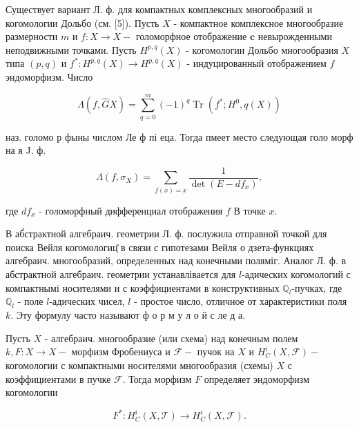 \documentclass[10pt]{article}
\begin{document}
Существует вариант Л. ф. для компактных комплексных многообразий и когомологии Дольбо (см. [5]). Пусть $X$ - компактное комплексное многообразие размерности $m$ и $f: X \rightarrow X-$ голоморфное отображение $\mathbf{c}$ невырожденными неподвижными точками. Пусть $H^{p, q}(X)$ - когомологии Дольбо многообразия $X$ типа $(p, q)$ и $f^{*}: H^{p, q}(X) \rightarrow H^{p, q}(X)$ - индуцированный отображением $f$ эндоморфизм. Число



\[

\Lambda(f, \widehat{G} X)=\sum_{q=0}^{m}(-1)^{q} \operatorname{Tr}\left(f^{*} ; H^{0}, q(X)\right)

\]



наз. голомо р фыны числом Ле ф пі еца. Тогда пмеет место следующая голо морф на я J. ф.



\[

\Lambda\left(f, \sigma_{X}\right)=\sum_{f(x)=x} \frac{1}{\operatorname{det}\left(E-d f_{x}\right)},

\]



где $d f_{x}$ - голоморфный дифференциал отображения $f$ В точке $x$.



В аб́страктной алгебраич. геометрии Л. ф. послужила отправной точкой для поиска Вейля когомологиц̆ в связи с гипотезами Вейля о дзета-функциях алгебраич. многообразий, определенных над конечными поляміг. Аналог Л. ф. в абстрактной алгебраич. геометрии устанавлівается для $l$-адических когомологий с компактнымі носителями и с коэффициентами в конструктивных $\mathbb{Q}_{l}$-пучках, где $\mathbb{Q}_{l}$ - поле $l$-адических чисел, $l$ - простое число, отличное от характеристики поля $k$. Эту формулу часто называют ф о р м у л о й с ле д а.



Пусть $X$ - алгебраич. многообразие (или схема) над конечным полем $k, F: X \rightarrow X-$ морфизм Фробениуса и $\mathscr{F}-$ пучок на $X$ и $H_{C}^{i}(X, \mathscr{F})-$ когомологии с компактными носителями многообразия (схемы) $X$ с коэффициентами в пучке $\mathscr{F}$. Тогда морфизм $F$ определяет эндоморфизм когомологии



\[

F^{*}: H_{C}^{i}(X, \mathscr{T}) \longrightarrow H_{C}^{i}(X, \mathscr{F}) .

\]
\end{document}
